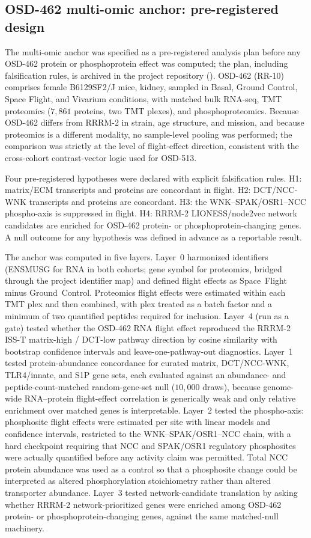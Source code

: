 \documentclass[11pt]{article}
\begin{document}
\subsection{OSD-462 multi-omic anchor: pre-registered design}

The multi-omic anchor was specified as a pre-registered analysis plan before any OSD-462 protein or phosphoprotein effect was computed; the plan, including falsification rules, is archived in the project repository (). OSD-462 (RR-10) comprises female B6129SF2/J mice, kidney, sampled in Basal, Ground Control, Space Flight, and Vivarium conditions, with matched bulk RNA-seq, TMT proteomics ($7{,}861$ proteins, two TMT plexes), and phosphoproteomics. Because OSD-462 differs from RRRM-2 in strain, age structure, and mission, and because proteomics is a different modality, no sample-level pooling was performed; the comparison was strictly at the level of flight-effect direction, consistent with the cross-cohort contrast-vector logic used for OSD-513.

Four pre-registered hypotheses were declared with explicit falsification rules. H1: matrix/ECM transcripts and proteins are concordant in flight. H2: DCT/NCC-WNK transcripts and proteins are concordant. H3: the WNK--SPAK/OSR1--NCC phospho-axis is suppressed in flight. H4: RRRM-2 LIONESS/node2vec network candidates are enriched for OSD-462 protein- or phosphoprotein-changing genes. A null outcome for any hypothesis was defined in advance as a reportable result.

The anchor was computed in five layers. Layer~0 harmonized identifiers (ENSMUSG for RNA in both cohorts; gene symbol for proteomics, bridged through the project identifier map) and defined flight effects as Space~Flight minus Ground~Control. Proteomics flight effects were estimated within each TMT plex and then combined, with plex treated as a batch factor and a minimum of two quantified peptides required for inclusion. Layer~4 (run as a gate) tested whether the OSD-462 RNA flight effect reproduced the RRRM-2 ISS-T matrix-high / DCT-low pathway direction by cosine similarity with bootstrap confidence intervals and leave-one-pathway-out diagnostics. Layer~1 tested protein-abundance concordance for curated matrix, DCT/NCC-WNK, TLR4/innate, and S1P gene sets, each evaluated against an abundance- and peptide-count-matched random-gene-set null ($10{,}000$ draws), because genome-wide RNA--protein flight-effect correlation is generically weak and only relative enrichment over matched genes is interpretable. Layer~2 tested the phospho-axis: phosphosite flight effects were estimated per site with linear models and confidence intervals, restricted to the WNK--SPAK/OSR1--NCC chain, with a hard checkpoint requiring that NCC and SPAK/OSR1 regulatory phosphosites were actually quantified before any activity claim was permitted. Total NCC protein abundance was used as a control so that a phosphosite change could be interpreted as altered phosphorylation stoichiometry rather than altered transporter abundance. Layer~3 tested network-candidate translation by asking whether RRRM-2 network-prioritized genes were enriched among OSD-462 protein- or phosphoprotein-changing genes, against the same matched-null machinery.
\end{document}
